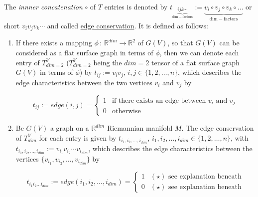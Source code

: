 \documentclass{article}
\newtheorem*{theorem A}{Theorem A}
\newtheorem*{theorem B}{N\"olker's Theorem}
\theoremstyle{remark}
\theoremstyle{remark}
\begin{document}
\vspace{0.3cm}
The \textit{innner concatenation} $\circ$ of $T$ entries is denoted by $t_{\underbrace{ijk\cdots}_{\mathrm{dim-factors}}} := \underbrace{v_{i} \circ v_{j} \circ v_{k} \circ \dots}_{\mathrm{dim-factors}}$ or short $v_{i}v_{j}v_{k} \cdots$ and called \underline{edge conservation}. It is defined as follows:

\begin{enumerate}
    \item If there exists a mapping $\phi \, : \, \mathbb{R}^{dim} \rightarrow \mathbb{R}^{2}$ of $G\left(V\right)$, so that $G\left(V\right)$ can be considered as a flat surface graph in terms of $\phi$, then we can denote each entry of $T^{V}_{dim=2}$ ($T^{V}_{dim=2}$ being the $dim = 2$ tensor of a flat surface graph $G\left(V\right)$ in terms of $\phi$) by $t_{ij} := v_{i}v_{j}$, $i,j \in \{ 1,2,\dots, n \}$, which describes the edge characteristics between the two vertices $v_{i}$ and $v_{j}$ by

    \begin{equation*}
        t_{ij} := edge\left(i,j\right) = 
        \begin{cases}
            1   & \text{if there exists an edge between } v_{i} \text{ and } v_{j}\\
            0   & \text{otherwise}
        \end{cases}
    \label{eq:edge2}
    \end{equation*}

    \item Be $G\left(V\right)$ a graph on a $\mathbb{R}^{dim}$ Riemannian manifold $M$. The edge conservation of $T^{V}_{dim}$ for each entry is given by $t_{i_{1}, i_{2}, \dots, i_{dim}}$, $i_{1}, i_{2}, \dots, i_{dim} \in \{ 1,2, \dots, n \}$, with $t_{i_{1}, i_{2}, \dots, i_{dim}} := v_{i_{1}} v_{i_{2}} \cdots v_{i_{dim}}$, which describes the edge characteristics between the vertices $\{ v_{i_{1}}, v_{i_{2}}, \dots, v_{i_{dim}} \}$ by 

    \begin{equation*}
        t_{i_{1}i_{2}\dots i_{dim}} := edge\left(i_{1},i_{2},\dots,i_{dim}\right) = 
        \begin{cases}
            1   & \left(\star\right) \text{ see explanation beneath}\\
            0   & \left(\star\right) \text{ see explanation beneath}
        \end{cases}
    \label{eq:edgeDim}
    \end{equation*}


\end{enumerate}
\end{document}
